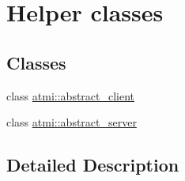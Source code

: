 \hypertarget{group__helpers}{\section{Helper classes}
\label{group__helpers}
}
\subsection*{Classes}
\begin{DoxyCompactItemize}
\item 
class \hyperlink{classatmi_1_1abstract__client}{atmi\+::abstract\+\_\+client}
\item 
class \hyperlink{classatmi_1_1abstract__server}{atmi\+::abstract\+\_\+server}
\end{DoxyCompactItemize}


\subsection{Detailed Description}
